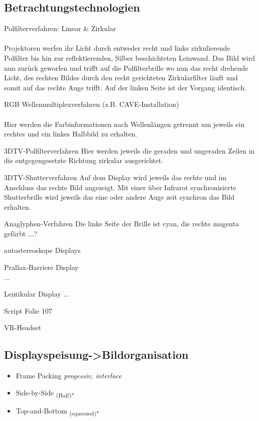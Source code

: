 \subsection{Betrachtungstechnologien}
\begin{description}
\item Polfilterverfahren: Linear \& Zirkular\\
\\
	Projektoren werfen ihr Licht durch entweder recht und links zirkulierende Polfilter bis hin zur reflektierenden, Silber beschichteten Leinwand. Das Bild wird nun zurück geworfen und trifft auf die Polfilterbrille wo nun das recht drehende Licht, des rechten Bildes durch den recht gerichteten Zirkularfilter läuft und somit auf das rechte Auge trifft. Auf der linken Seite ist der Vorgang identisch.
	 
\item RGB Wellenmultiplexverfahren (z.B. CAVE-Installation) \\
\\
Hier werden die Farbinformationen nach Wellenlängen getrennt um jeweils ein rechtes und ein linkes Halbbild zu erhalten.

\item 3DTV-Polfilterverfahren
Hier werden jeweils die geraden und ungeraden Zeilen in die entgegengesetzte Richtung zirkular ausgerichtet.

\item 3DTV-Shutterverfahren
Auf dem Display wird jeweils das rechte und im Anschluss das rechte Bild angezeigt. Mit einer über Infrarot synchronisierte Shutterbrille wird jeweils das eine oder andere Auge zeit synchron das Bild erhalten.

\item Anaglyphen-Verfahren
Die linke Seite der Brille ist cyan, die rechte magenta gefärbt ...?

\item autostereoskope Displays\\
\begin{description}
\item Prallax‐Barriere Display\\
...
\item Lentikular Display
...
\end{description}
Script Folie 107
\item VR-Headset
\end{description}

\subsection{Displayspeisung->Bildorganisation}
\begin{itemize}
\item Frame Packing \textit{progessiv, interlace} \\

\item Side-by-Side \textsubscript{(Half)*}

\item Top-and-Bottom \textsubscript{(squeezed)*}
\end{itemize}


